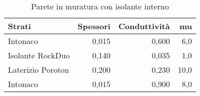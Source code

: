 \begin{table}[H]
\centering
\caption{Parete in muratura con isolante interno}
\begin{tabular}{lrrr}
\toprule
            Strati & Spessori & Conduttività  &    mu \\
\midrule
          Intonaco &    0,015 &                0,600 &   6,0 \\
  Isolante RockDuo &    0,140 &                0,035 &   1,0 \\
 Laterizio Poroton &    0,200 &                0,230 &  10,0 \\
          Intonaco &    0,015 &                0,900 &   8,0 \\
\bottomrule
\end{tabular}
\end{table}
